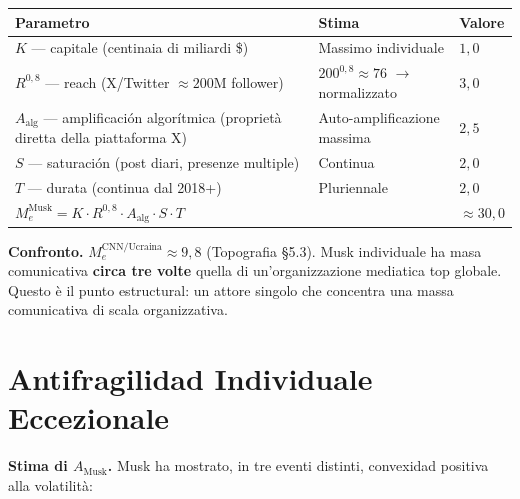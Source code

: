 {\def\LTcaptype{none} %
{\small\begin{longtable}[]{@{}
  >{\raggedright\arraybackslash}p{}
  >{\raggedright\arraybackslash}p{}
  >{\raggedright\arraybackslash}p{}@{}}
\toprule\noalign{}
\begin{minipage}[b]{\linewidth}\raggedright
Parametro
\end{minipage} & \begin{minipage}[b]{\linewidth}\raggedright
Stima
\end{minipage} & \begin{minipage}[b]{\linewidth}\raggedright
Valore
\end{minipage} \\
\midrule\noalign{}
\endhead
\bottomrule\noalign{}
\endlastfoot
\(K\) --- capitale (centinaia di miliardi \$) & Massimo individuale &
\(1{,}0\) \\
\(R^{0{,}8}\) --- reach (X/Twitter \(\approx 200\)M follower) &
\(200^{0{,}8} \approx 76\) $\to$ normalizzato & \(3{,}0\) \\
\(A_{\text{alg}}\) --- amplificación algorítmica (proprietà diretta
della piattaforma X) & Auto-amplificazione massima & \(2{,}5\) \\
\(S\) --- saturación (post diari, presenze multiple) & Continua &
\(2{,}0\) \\
\(T\) --- durata (continua dal 2018+) & Pluriennale & \(2{,}0\) \\
\textbf{\(M_e^{\text{Musk}} = K \cdot R^{0{,}8} \cdot A_{\text{alg}} \cdot S \cdot T\)}
& & \textbf{\(\approx 30{,}0\)} \\
\end{longtable}}
}

\Hypoth{} \textbf{Confronto.} \(M_e^{\text{CNN/Ucraina}} \approx 9{,}8\)
(Topografia \S{}5.3). Musk individuale ha masa comunicativa \textbf{circa
tre volte} quella di un'organizzazione mediatica top globale. Questo è
il punto estructural: un attore singolo che concentra una massa
comunicativa di scala organizzativa.



\section{Antifragilidad Individuale
Eccezionale}\label{antifragilituxe0-individuale-eccezionale}

\Hypoth{} \textbf{Stima di \(A_{\text{Musk}}\).} Musk ha mostrato, in
tre eventi distinti, convexidad positiva alla volatilità:

